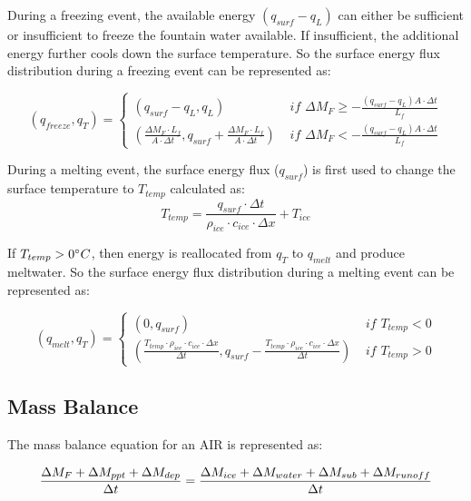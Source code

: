 \documentclass[utf8]{frontiersSCNS} %
\begin{document}
During a freezing event, the available energy $(q_{surf}-q_{L})$ can either be sufficient or insufficient to freeze the
fountain water available. If insufficient, the additional energy further cools down the surface temperature. So the
surface energy flux distribution during a freezing event can be represented as:

\begin{equation} 
    (q_{freeze}, q_{T}) = \left\{ \begin{array}{ll}
            (q_{surf}-q_{L}, q_{L}) & \textit{ if } \Delta M_{F} \geq -\frac{(q_{surf}-q_{L}) A \cdot \Delta
        t}{L_f} \\
(\frac{\Delta M_{F} \cdot L_f 
        }{A \cdot \Delta t}
        , q_{surf}+\frac{\Delta M_{F} \cdot L_f 
        }{A \cdot \Delta t}) & \textit{ if } \Delta M_{F} < -\frac{(q_{surf}-q_{L}) A \cdot \Delta
        t}{L_f}
    \end{array} \right. 
\end{equation} 

During a melting event, the surface energy flux ($q_{surf}$) is first used to change the surface temperature to $T_{temp}$
calculated as:
\begin{equation} T_{temp} =\frac{q_{surf} \cdot \Delta t}{\rho_{ice} \cdot c_{ice} \cdot \Delta x} + T_{ice} \end{equation}

If $T_{temp} > 0 \degree C$, then energy is reallocated from $q_{T}$ to $q_{melt}$ and produce meltwater. So the surface energy flux distribution
during a melting event can be represented as:

\begin{equation} 
    (q_{melt}, q_{T}) = \left\{ \begin{array}{ll}
            (0, q_{surf}) & \textit{ if } T_{temp} < 0\\
            (\frac{T_{temp} \cdot \rho_{ice} \cdot c_{ice} \cdot \Delta x}{\Delta t}, q_{surf}-\frac{T_{temp} \cdot \rho_{ice} \cdot c_{ice} \cdot \Delta x}{\Delta t}  ) & \textit{ if } T_{temp} > 0
    \end{array} \right.  
\end{equation} 


\subsection{Mass Balance} 
The mass balance equation for an AIR is represented as:

\begin{equation}
    \frac{\Delta M_{F} + \Delta M_{ppt} + \Delta M_{dep}}{\Delta t} = \frac{\Delta M_{ice} +\Delta M_{water} +
    \Delta M_{sub} + \Delta M_{runoff}}{\Delta t}  \\
    \label{eq:MB} 
\end{equation}
\end{document}
